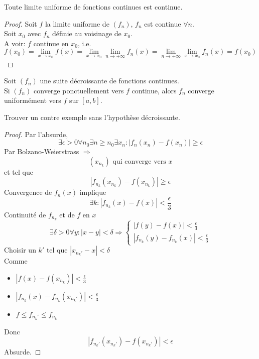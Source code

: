 \documentclass[../main.tex]{subfiles}
\begin{document}
\begin{thm}
Toute limite uniforme de fonctions continues est continue.
\end{thm}
\begin{proof}
	Soit $f$ la limite uniforme de $( f_n) $, $f_n$ est continue $\forall n$.\\
	Soit $x_0$ avec $f_n$ définie au voisinage de $x_0$.\\
	A voir: $f$ continue en $x_0$, i.e.
	\[ 
		f( x_0) = \lim_{x \to x_0} f( x) = \lim_{x \to x_0} \lim_{n \to  + \infty} f_n( x) = \lim_{n \to  + \infty} \lim_{x \to x_0} f_n( x) = f( x_0)  
	\]
	
\end{proof}
\begin{thm}[Dini]
	Soit $( f_n) $ une suite décroissante de fonctions continues.\\
	Si $( f_n) $ converge ponctuellement vers $f$ continue, alors $f_n$ converge uniformément vers $f$ sur $[a,b]$.

\end{thm}
\begin{exo}
Trouver un contre exemple sans l'hypothèse décroissante.
\end{exo}
\begin{proof}
Par l'absurde, 
\[ 
	\exists \epsilon> 0 \forall n_0\exists n\geq n_0 \exists x_n: |f_n( x_n) - f( x_n) | \geq \epsilon
\]
Par Bolzano-Weierstrass $\Rightarrow$ 
\[ 
	( x_{n_k} ) \text{ qui converge vers  } x
\]
et tel que
\[ 
	|f_{n_k} ( x_{n_k} ) - f( x_{n_k} ) | \geq \epsilon
\]
Convergence de $f_{n} ( x) $ implique
\[ 
	\exists k: |f_{n_k} ( x) -f( x) |< \frac{\epsilon}{3}
\]
Continuité de $f_{n_k} $ et de $f$ en $x$ 
\[ 
\exists \delta> 0 \forall y: |x-y|< \delta \Rightarrow 
\begin{cases}
	|f( y) - f( x) |< \frac{\epsilon}{3}\\
	|f_{n_k} ( y) - f_{n_k} ( x)| < \frac{\epsilon}{3}
\end{cases}
\]
Choisir un $k'$ tel que $|x_{n_k'} -x|< \delta$ \\
Comme 
\begin{itemize}
	\item $|f( x) -f( x_{n_k} )| < \frac{\epsilon}{3}$ 
	\item  $|f_{n_k} ( x) - f_{n_k} ( x_{n_k'} ) |< \frac{\epsilon}{3}$
	\item $f \leq f_{n_k'} \leq f_{n_k} $
\end{itemize}
Donc 
\[ 
	|f_{n_k'} ( x_{n_k'} ) - f( x_{n_k'} ) | < \epsilon 
\]
Absurde.

\end{proof}
\end{document}

